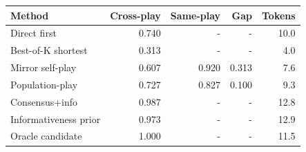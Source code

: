\begin{tabular}{lrrrr}
\toprule
Method & Cross-play & Same-play & Gap & Tokens \\
\midrule
Direct first & 0.740 & - & - & 10.0 \\
Best-of-K shortest & 0.313 & - & - & 4.0 \\
Mirror self-play & 0.607 & 0.920 & 0.313 & 7.6 \\
Population-play & 0.727 & 0.827 & 0.100 & 9.3 \\
Consensus+info & 0.987 & - & - & 12.8 \\
Informativeness prior & 0.973 & - & - & 12.9 \\
Oracle candidate & 1.000 & - & - & 11.5 \\
\bottomrule
\end{tabular}
